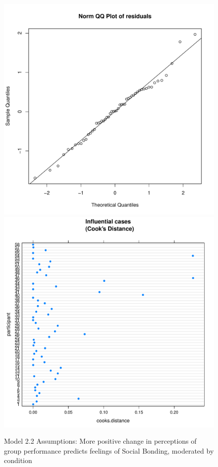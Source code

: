\begin{figure}[htbp]
    \includegraphics[scale =.4]{images/TEM22QQNorm.pdf}
    \includegraphics[scale =.4]{images/TEM22CooksD.pdf}
    \caption{Model 2.2 Assumptions: More positive change in perceptions of group performance predicts feelings of Social Bonding, moderated by condition}
    \label{fig:M23Assumptions}
\end{figure}


